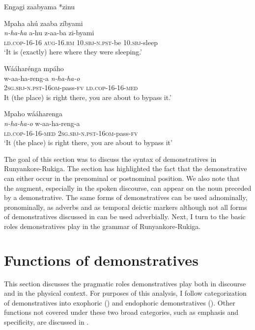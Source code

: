 \documentclass[output=paper 		  ]{langscibook}
\begin{document}
\ea%
    \label{ex:asiimwe:44}
    \ea\label{ex:asiimwe:44a}  Engagi zaabyama *zinu

  \ex\label{ex:asiimwe:44b}  Mpaha ahú zaaba zíbyami\\
    \gll \emph{n-ha-ha}  a-hu  z-aa-ba  zi-byami\\
    \textsc{ld.cop}{}-16-16  \textsc{aug}{}-16.\textsc{rm}  \textsc{10.sbj-n.pst}{}-be  10.\textsc{sbj-}sleep\\
    \glt ‘It is (exactly) here where they were sleeping.’

    \ex\label{ex:asiimwe:44c}  Wááharénga mpáho\\
    \gll w-aa-ha-reng-a  \emph{n-ha-ha-o}\\
  2\textsc{sg.sbj-n.pst}{}-16\textsc{om}{}-pass-\textsc{fv}  \textsc{ld.cop}{}-16-16-\textsc{med}\\
    \glt It (the place) is right there, you are about to bypass it.’

    \ex\label{ex:asiimwe:44d}  Mpaho wááharenga\\
    \gll \emph{n-ha-ha-o}  w-aa-ha-reng-a\\
  \textsc{ld.cop}{}-16-16-\textsc{med}  2\textsc{sg.sbj-n.pst}{}-16\textsc{om}{}-pass-\textsc{fv}\\
  \glt `It (the place) is right there, you are about to bypass it’
  \z
\z

The goal of this section was to discuss the syntax of demonstratives in Run\-yan\-ko\-re-Ru\-ki\-ga. The section has highlighted the fact that the demonstrative can either occur in the prenominal or postnominal position. We also note that the augment, especially in the spoken discourse, can appear on the noun preceded by a demonstrative. The same forms of demonstratives can be used adnominally, pronominally, as adverbs and as temporal deictic markers although not all forms of demonstratives discussed in  can be used adverbially. Next, I turn to the basic roles demonstratives play in the grammar of Run\-yan\-ko\-re-Ru\-ki\-ga.

\section{Functions of demonstratives}\label{sec:asiimwe:4}

This section discusses the pragmatic roles demonstratives play both in discourse and in the physical context. For purposes of this analysis, I follow  categorization of demonstratives into exophoric () and endophoric demonstratives (). Other functions not covered under these two broad categories, such as emphasis and specificity, are discussed in .
\end{document}
